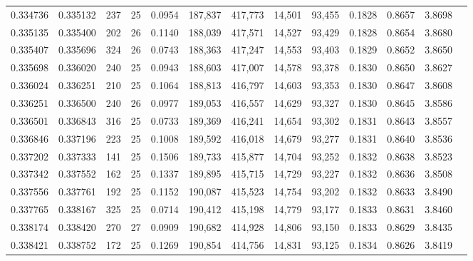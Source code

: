 \begin{tabular}{rrrrrrrrrrrrr}
0.334736 & 0.335132 &   237 &  25 &                                     0.0954 & 187,837 & 417,773 &  14,501 &  93,455 & 0.1828 & 0.8657 & 3.8698 \\
0.335135 & 0.335400 &   202 &  26 &                                     0.1140 & 188,039 & 417,571 &  14,527 &  93,429 & 0.1828 & 0.8654 & 3.8680 \\
0.335407 & 0.335696 &   324 &  26 &                                     0.0743 & 188,363 & 417,247 &  14,553 &  93,403 & 0.1829 & 0.8652 & 3.8650 \\
0.335698 & 0.336020 &   240 &  25 &                                     0.0943 & 188,603 & 417,007 &  14,578 &  93,378 & 0.1830 & 0.8650 & 3.8627 \\
0.336024 & 0.336251 &   210 &  25 &                                     0.1064 & 188,813 & 416,797 &  14,603 &  93,353 & 0.1830 & 0.8647 & 3.8608 \\
0.336251 & 0.336500 &   240 &  26 &                                     0.0977 & 189,053 & 416,557 &  14,629 &  93,327 & 0.1830 & 0.8645 & 3.8586 \\
0.336501 & 0.336843 &   316 &  25 &                                     0.0733 & 189,369 & 416,241 &  14,654 &  93,302 & 0.1831 & 0.8643 & 3.8557 \\
0.336846 & 0.337196 &   223 &  25 &                                     0.1008 & 189,592 & 416,018 &  14,679 &  93,277 & 0.1831 & 0.8640 & 3.8536 \\
0.337202 & 0.337333 &   141 &  25 &                                     0.1506 & 189,733 & 415,877 &  14,704 &  93,252 & 0.1832 & 0.8638 & 3.8523 \\
0.337342 & 0.337552 &   162 &  25 &                                     0.1337 & 189,895 & 415,715 &  14,729 &  93,227 & 0.1832 & 0.8636 & 3.8508 \\
0.337556 & 0.337761 &   192 &  25 &                                     0.1152 & 190,087 & 415,523 &  14,754 &  93,202 & 0.1832 & 0.8633 & 3.8490 \\
0.337765 & 0.338167 &   325 &  25 &                                     0.0714 & 190,412 & 415,198 &  14,779 &  93,177 & 0.1833 & 0.8631 & 3.8460 \\
0.338174 & 0.338420 &   270 &  27 &                                     0.0909 & 190,682 & 414,928 &  14,806 &  93,150 & 0.1833 & 0.8629 & 3.8435 \\
0.338421 & 0.338752 &   172 &  25 &                                     0.1269 & 190,854 & 414,756 &  14,831 &  93,125 & 0.1834 & 0.8626 & 3.8419 \\

\end{tabular}
